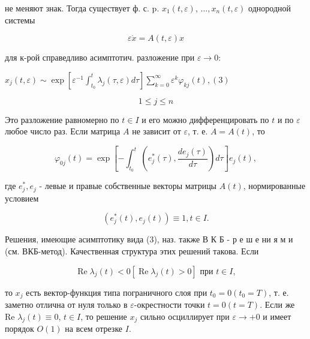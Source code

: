\documentclass[10pt]{article}
\begin{document}
не меняют знак. Тогда существует ф. с. p. $x_{1}(t, \varepsilon)$, $\ldots, x_{n}(t, \varepsilon)$ однородной системы



\[

\varepsilon \dot{x}=A(t, \varepsilon) x

\]



для к-рой справедливо асимптотич. разложение при $\varepsilon \rightarrow 0:$



$x_{j}(t, \varepsilon) \sim \exp \left[\varepsilon^{-1} \int_{t_{0}}^{t} \lambda_{j}(\tau, \varepsilon) d \tau\right] \sum_{k=0}^{\infty} \varepsilon^{k} \varphi_{k j}(t),(3)$



\[

1 \leqslant j \leqslant n

\]



Это разложение равномерно по $t \in I$ и его можно дифференцировать по $t$ и по $\varepsilon$ любое число раз. Если матрица $A$ не зависит от $\varepsilon$, т. е. $A=A(t)$, то



\[

\varphi_{0 j}(t)=\exp \left[-\int_{t_{0}}^{t}\left(e_{j}^{*}(\tau), \frac{d e_{j}(\tau)}{d \tau}\right) d \tau\right] e_{j}(t),

\]



где $e_{j}^{*}, e_{j}$ - левые и правые собственные векторы матрицы $A(t)$, нормированные условием



\[

\left(e_{j}^{*}(t), e_{j}(t)\right) \equiv 1, t \in I .

\]



Решения, имеющие асимптотику вида (3), наз. также В К Б - р е ш е ни я м и (см. ВКБ-метод). Качественная структура этих решений такова. Если



\[

\operatorname{Re} \lambda_{j}(t)<0\left[\operatorname{Re} \lambda_{j}(t)>0\right] \text { при } t \in I,

\]



то $x_{j}$ есть вектор-функция типа пограничного слоя при $t_{0}=0\left(t_{0}=T\right)$, т. е. заметно отлична от нуля только в $\varepsilon$-окрестности точки $t=0(t=T)$. Если же Re $\lambda_{j}(t) \equiv 0$, $t \in I$, то решение $x_{j}$ сильно осциллирует при $\varepsilon \rightarrow+0$ и имеет порядок $O(1)$ на всем отрезке $I$.
\end{document}
